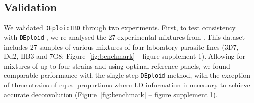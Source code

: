 \documentclass[9pt,lineno]{elife}
\begin{document}
\begin{figure}[ht]
\end{figure}


\subsection{Validation}

We validated \texttt{DEploidIBD} through two experiments.  First, to test consistency with \texttt{DEploid} \citet{Zhu2017}, we re-analysed the 27 experimental mixtures from \citep{Wendler2015}.  This dataset includes 27 samples of various mixtures of four laboratory parasite lines (3D7, Dd2, HB3 and 7G8; Figure~\ref{fig:benchmark} -- figure supplement 1).  Allowing for mixtures of up to four strains and using optimal reference panels, we found comparable performance with the single-step \texttt{DEploid} method, with the exception of three strains of equal proportions where LD information is necessary to achieve accurate deconvolution (Figure~\ref{fig:benchmark} -- figure supplement 1).
\end{document}
